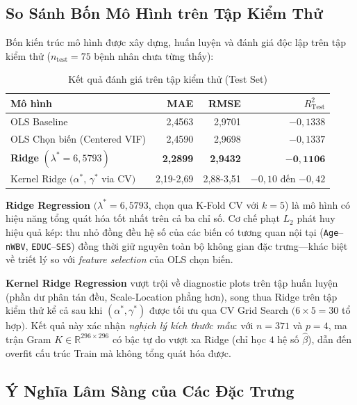 \subsection{So Sánh Bốn Mô Hình trên Tập Kiểm Thử}
 
Bốn kiến trúc mô hình được xây dựng, huấn luyện và đánh giá độc lập trên tập
kiểm thử (\(n_{\text{test}} = 75\) bệnh nhân chưa từng thấy):
 
\begin{table}[h]
  \centering
  \caption{Kết quả đánh giá trên tập kiểm thử (Test Set)}
  \label{tab:model_comparison}
  \begin{tabular}{lrrr}
    \toprule
    \textbf{Mô hình} & \textbf{MAE} & \textbf{RMSE} & \boldmath$R^2_{\text{Test}}$ \\
    \midrule
    OLS Baseline                                     & 2{,}4563 & 2{,}9701 & $-0{,}1338$ \\
    OLS Chọn biến (Centered VIF)                     & 2{,}4590 & 2{,}9698 & $-0{,}1337$ \\
    \textbf{Ridge} $(\lambda^* = 6{,}5793)$          & \textbf{2{,}2899} & \textbf{2{,}9432} & $\mathbf{-0{,}1106}$ \\
    Kernel Ridge $(\alpha^*,\,\gamma^*$ via CV$)$    & 2{,}19-2{,}69 & 2{,}88-3{,}51 & $-0{,}10$ đến $-0{,}42$ \\
    \bottomrule
  \end{tabular}
\end{table}
 
\textbf{Ridge Regression} $(\lambda^* = 6{,}5793$, chọn qua K-Fold CV với
\(k=5\)) là mô hình có hiệu năng tổng quát hóa tốt nhất trên cả ba chỉ số.
Cơ chế phạt $L_2$ phát huy hiệu quả kép: thu nhỏ đồng đều hệ số của các biến
có tương quan nội tại (\texttt{Age}--\texttt{nWBV}, \texttt{EDUC}--\texttt{SES})
đồng thời giữ nguyên toàn bộ không gian đặc trưng—khác biệt về triết lý so với
\emph{feature selection} của OLS chọn biến.
 
\textbf{Kernel Ridge Regression} vượt trội về diagnostic plots trên tập huấn
luyện (phần dư phân tán đều, Scale-Location phẳng hơn), song thua Ridge trên
tập kiểm thử kể cả sau khi $(\alpha^*, \gamma^*)$ được tối ưu qua CV Grid
Search $(6 \times 5 = 30$ tổ hợp$)$. Kết quả này xác nhận \emph{nghịch lý kích
thước mẫu}: với $n = 371$ và $p = 4$, ma trận Gram
$K \in \mathbb{R}^{296 \times 296}$ có bậc tự do vượt xa Ridge (chỉ học
$4$ hệ số $\hat{\beta}$), dẫn đến overfit cấu trúc Train mà không tổng quát
hóa được.
 
\subsection{Ý Nghĩa Lâm Sàng của Các Đặc Trưng}
 
